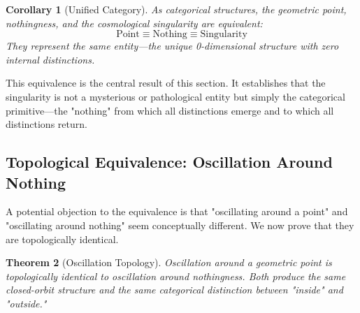 \documentclass[12pt,a4paper]{article}
\newtheorem{theorem}{Theorem}[section]
\newtheorem{corollary}[theorem]{Corollary}
\theoremstyle{definition}
\theoremstyle{remark}
\begin{document}
\begin{corollary}[Unified Category]
\label{cor:unified_category}
As categorical structures, the geometric point, nothingness, and the cosmological singularity are equivalent:
\begin{equation}
\text{Point} \equiv \text{Nothing} \equiv \text{Singularity}
\end{equation}
They represent the same entity—the unique 0-dimensional structure with zero internal distinctions.
\end{corollary}

This equivalence is the central result of this section. It establishes that the singularity is not a mysterious or pathological entity but simply the categorical primitive—the "nothing" from which all distinctions emerge and to which all distinctions return.

\subsection{Topological Equivalence: Oscillation Around Nothing}

A potential objection to the equivalence is that "oscillating around a point" and "oscillating around nothing" seem conceptually different. We now prove that they are topologically identical.

\begin{theorem}[Oscillation Topology]
\label{thm:oscillation_topology}
Oscillation around a geometric point is topologically identical to oscillation around nothingness. Both produce the same closed-orbit structure and the same categorical distinction between "inside" and "outside."
\end{theorem}
\end{document}
